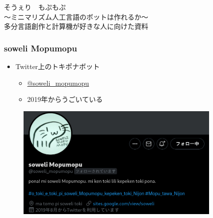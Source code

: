 \documentclass[14pt]{beamer}
\begin{document}
\begin{frame}
	\begin{center}
		{\huge \color{cyan} そうぇり　もぷもぷ} \\
		\vspace{2em}
		{\small 〜ミニマリズム人工言語のボットは作れるか〜} \\
		{\scriptsize 多分言語創作と計算機が好きな人に向けた資料}
	\end{center}
\end{frame}


\begin{frame}
	\frametitle{soweli Mopumopu}
	
	\begin{itemize}
		\item Twitter上のトキポナボット
			\begin{itemize}
				\item \href{https://twitter.com/soweli_mopumopu}{@soweli\_mopumopu}
				\item 2019年からうごいている
			\end{itemize}
	\end{itemize}
	
	\begin{figure}[H]
		\centering
		\includegraphics[width=10cm]{mopumopu.png}
	\end{figure}
\end{frame}
\end{document}

